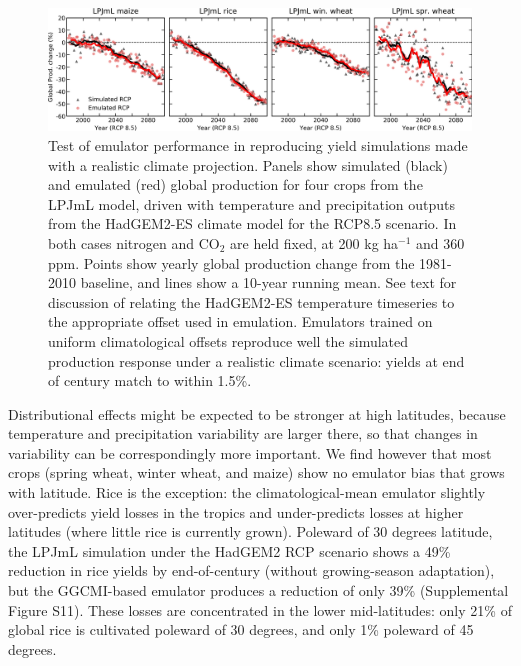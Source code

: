 \documentclass[gmdd]{copernicus} %
\begin{document}
\begin{figure}[ht]
    \centering
    \includegraphics[width = 16.3cm]{figures/LPJMLRCP85comp.png}
    \caption{
    Test of emulator performance in reproducing yield simulations made with a realistic climate projection. 
    Panels show simulated (black) and emulated (red) global production for four crops from the LPJmL model, driven with temperature and precipitation outputs from the HadGEM2-ES climate model for the RCP8.5 scenario. 
    In both cases nitrogen and CO$_2$ are held fixed, at 200 kg ha$^{-1}$ and 360 ppm.
    Points show yearly global production change from the 1981-2010 baseline, and lines show a 10-year running mean. 
    See text for discussion of relating the HadGEM2-ES temperature timeseries to the appropriate offset used in emulation.
    Emulators trained on uniform climatological offsets reproduce well the simulated production response under a realistic climate scenario: yields at end of century match to within 1.5\%. 
    }
    \label{fig:lpjmlrcp}
\end{figure}

Distributional effects might be expected to be stronger at high latitudes, because temperature and precipitation variability are larger there, so that changes in variability can be correspondingly more important. 
We find however that most crops (spring wheat, winter wheat, and maize) show no emulator bias that grows with latitude.
Rice is the exception: the climatological-mean emulator slightly over-predicts yield losses in the tropics and under-predicts losses at higher latitudes (where little rice is currently grown). 
Poleward of 30 degrees latitude, the LPJmL simulation under the HadGEM2 RCP scenario shows a 49\% reduction in rice yields by end-of-century (without growing-season adaptation), but the GGCMI-based emulator produces a reduction of only 39\% (Supplemental Figure S11). 
These losses are concentrated in the lower mid-latitudes: only 21\% of global rice is cultivated poleward of 30 degrees, and only 1\% poleward of 45 degrees.
\end{document}
